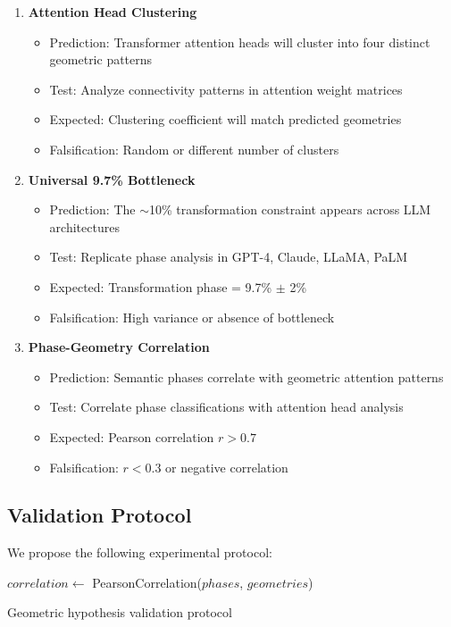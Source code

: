 \documentclass[pmlr,onecolumn]{jmlr}
\begin{document}
\begin{enumerate}
\item \textbf{Attention Head Clustering}
\begin{itemize}
\item Prediction: Transformer attention heads will cluster into four distinct geometric patterns
\item Test: Analyze connectivity patterns in attention weight matrices
\item Expected: Clustering coefficient will match predicted geometries
\item Falsification: Random or different number of clusters
\end{itemize}

\item \textbf{Universal 9.7\% Bottleneck}
\begin{itemize}
\item Prediction: The $\sim$10\% transformation constraint appears across LLM architectures
\item Test: Replicate phase analysis in GPT-4, Claude, LLaMA, PaLM
\item Expected: Transformation phase = 9.7\% $\pm$ 2\%
\item Falsification: High variance or absence of bottleneck
\end{itemize}

\item \textbf{Phase-Geometry Correlation}
\begin{itemize}
\item Prediction: Semantic phases correlate with geometric attention patterns
\item Test: Correlate phase classifications with attention head analysis
\item Expected: Pearson correlation $r > 0.7$
\item Falsification: $r < 0.3$ or negative correlation
\end{itemize}
\end{enumerate}

\subsection{Validation Protocol}

We propose the following experimental protocol:

\begin{algorithm}
\SetAlgoLined
{}
$correlation \leftarrow$ PearsonCorrelation($phases$, $geometries$)\;
\;
\caption{Geometric hypothesis validation protocol}
\end{algorithm}
\end{document}
